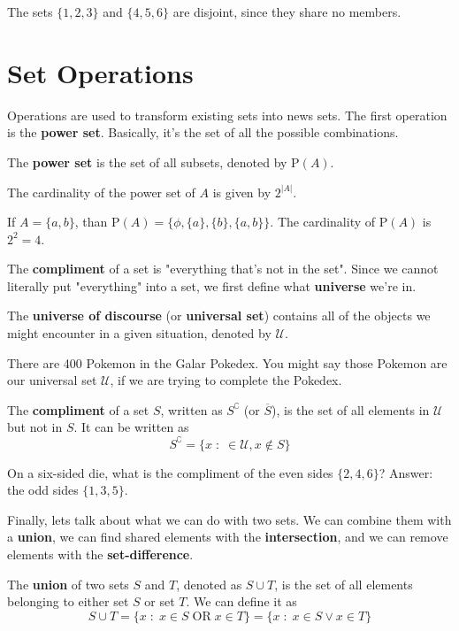 \myexample
{
	The sets $\{1,2,3\}$ and $\{4,5,6\}$ are disjoint, since they share no members.
}



\section{Set Operations}

Operations are used to transform existing sets into news sets.  The first operation is the {\bf power set}. Basically, it's the set of all the possible combinations.

\mydefine
{
	The {\bf power set} is the set of all subsets, denoted by $\text{P}(A)$.
}

\myproposition
{
	The cardinality of the power set of $A$ is given by $2^{|A|}$.
}

\myexample
{
	If $A=\{a,b\}$, than $\text{P}(A) = \{\phi,\{a\},\{b\},\{a,b\}\}$. The cardinality of $\text{P}(A)$ is $2^{2}=4$.
}

The {\bf compliment} of a set is "everything that's not in the set". Since we cannot literally put "everything" into a set, we first define what {\bf universe} we're in. 

\mydefine
{
	The {\bf universe of discourse} (or {\bf universal set}) contains all of the objects we might encounter in a given situation, denoted by $\mathcal{U}$.
}

\myexample
{
	There are 400 Pokemon in the Galar Pokedex. You might say those Pokemon are our universal set $\mathcal{U}$, if we are trying to complete the Pokedex.
}

\mydefine
{
	The {\bf compliment} of a set $S$, written as $S^\complement$ (or $\overline{S}$), is the set of all elements in $\mathcal{U}$ but not in $S$. It can be written as
	\[
		S^\complement = \{x \;:\; \in \mathcal{U}, x \notin S\}
	\]
}

\myexample
{
	On a six-sided die, what is the compliment of the even sides $\{2,4,6\}$? Answer: the odd sides $\{1,3,5\}$.
}

Finally, lets talk about what we can do with two sets. We can combine them with a {\bf union}, we can find shared elements with the {\bf intersection}, and we can remove elements with the {\bf set-difference}.

\mydefine
{
	The {\bf union} of two sets $S$ and $T$, denoted as $S \cup T$, is the set of all elements belonging to either set $S$ or set $T$. We can define it as
	\[
		S \cup T = \{x \;:\; x \in S \;\text{OR}\; x \in T \} = \{x \;:\; x \in S \vee x \in T \}
	\]
}

